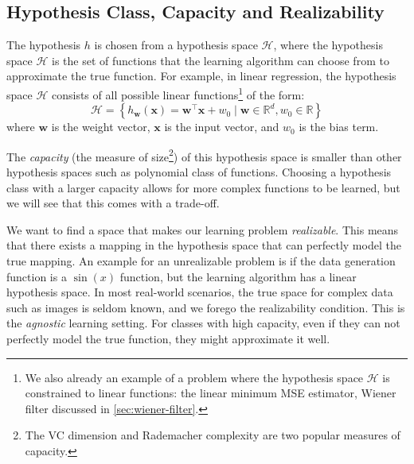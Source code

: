 
\subsection{Hypothesis Class, Capacity and Realizability}
The hypothesis $h$ is chosen from a hypothesis space $\mathcal{H}$, where the hypothesis space $\mathcal{H}$ is the set of functions that the learning algorithm can choose from to approximate the true function. 
For example, in linear regression, the hypothesis space $\mathcal{H}$ consists of all possible linear functions\footnote{We also already an example of a problem where the hypothesis space $\mathcal{H}$ is constrained to linear functions: the linear minimum \gls{MSE} estimator, Wiener filter discussed in \cref{sec:wiener-filter}.} of the form:
\begin{equation}\label{eq:linear-hypothesis}
   \mathcal{H} =  \left\{ h_{\mathbf{w}}(\mathbf{x}) = \mathbf{w}^\top \mathbf{x} + w_0 \mid \mathbf{w} \in \mathbb{R}^d, w_0 \in \mathbb{R} \right\}
\end{equation}
where $\mathbf{w}$ is the weight vector, $\mathbf{x}$ is the input vector, and $w_0$ is the bias term. 

The \textit{capacity} (the measure of size\footnote{The VC dimension and Rademacher complexity are two popular measures of capacity.}) of this hypothesis space is smaller than other hypothesis spaces such as polynomial class of functions. Choosing a hypothesis class with a larger capacity allows for more complex functions to be learned, but we will see that this comes with a trade-off.

We want to find a space that makes our learning problem \textit{realizable}. This means that there exists a mapping in the hypothesis space that can perfectly model the true mapping. An example for an unrealizable problem is if the data generation function is a $\sin(x)$ function, but the learning algorithm has a linear hypothesis space. In most real-world scenarios, the true space for complex data such as images is seldom known, and we forego the realizability condition. This is the \textit{agnostic} learning setting. For classes with high capacity, even if they can not perfectly model the true function, they might approximate it well.

